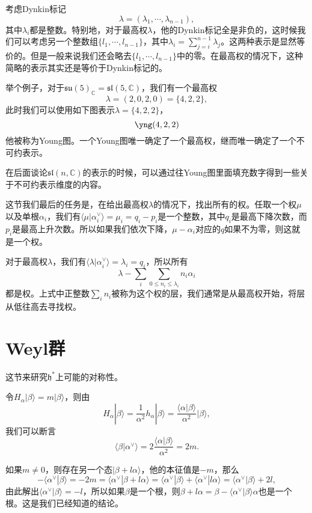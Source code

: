 \documentclass[9pt]{extarticle}
\newcommand{\cc}{\mathbb{C}}
\begin{document}
\para 考虑Dynkin标记
\[
	\lambda=(\lambda_1,\cdots,\lambda_{n-1}),
\]
其中$\lambda_i$都是整数。特别地，对于最高权$\lambda$，他的Dynkin标记全是非负的，这时候我们可以考虑另一个整数组$\{l_1,\cdots,l_{n-1}\}$，其中$\lambda_i=\sum_{j=i}^{n-1}\lambda_j$。这两种表示是显然等价的。但是一般来说我们还会略去$\{l_1,\cdots,l_{n-1}\}$中的零。在最高权的情况下，这种简略的表示其实还是等价于Dynkin标记的。

举个例子，对于$\mathfrak{su}(5)_\cc=\mathfrak{sl}(5,\cc)$，我们有一个最高权
\[
	\lambda=(2,0,2,0)=\{4,2,2\},
\]
此时我们可以使用如下图表示$\lambda=\{4,2,2\}$，
\[
	\yng(4,2,2)
\]
他被称为Young图。一个Young图唯一确定了一个最高权，继而唯一确定了一个不可约表示。

在后面谈论$\mathfrak{sl}(n,\cc)$的表示的时候，可以通过往Young图里面填充数字得到一些关于不可约表示维度的内容。

\para 这节我们最后的任务是，在给出最高权$\lambda$的情况下，找出所有的权。任取一个权$\mu$以及单根$\alpha_i$，我们有$\langle\mu|\alpha^\vee_i\rangle=\mu_i=q_i-p_i$是一个整数，其中$q_i$是最高下降次数，而$p_i$是最高上升次数。所以如果我们依次下降，$\mu-\alpha_i$对应的$q$如果不为零，则这就是一个权。

对于最高权$\lambda$，我们有$\langle\lambda|\alpha^\vee_i\rangle=\lambda_i=q_i$，所以所有
\[
	\lambda-\sum_i\sum_{0\leq n_i\leq \lambda_i}n_i\alpha_i
\]
都是权。上式中正整数$\sum_i n_i$被称为这个权的层，我们通常是从最高权开始，将层从低往高去寻找权。

\section{Weyl群}

这节来研究$\mathfrak{h}^*$上可能的对称性。

\para 令$H_\alpha|\beta\rangle = m|\beta\rangle$，则由
\[
	H_\alpha|\beta\rangle = \frac{1}{\alpha^2}h_\alpha|\beta\rangle=\frac{\langle\alpha|\beta\rangle}{\alpha^2}|\beta\rangle,
\]
我们可以断言
\[
	\langle\beta|\alpha^\vee\rangle=2\frac{\langle\alpha|\beta\rangle}{\alpha^2}=2m.
\]

如果$m\neq 0$，则存在另一个态$|\beta+l\alpha\rangle$，他的本征值是$-m$，那么
\[
	-\langle \alpha^\vee|\beta\rangle=-2m=\langle \alpha^\vee|\beta+l\alpha\rangle=\langle \alpha^\vee|\beta\rangle+\langle \alpha^\vee|l\alpha\rangle=\langle \alpha^\vee|\beta\rangle+2l,
\]
由此解出$\langle \alpha^\vee|\beta\rangle=-l$，所以如果$\beta$是一个根，则$\beta+l\alpha=\beta-\langle \alpha^\vee|\beta\rangle\alpha$也是一个根。这是我们已经知道的结论。
\end{document}
